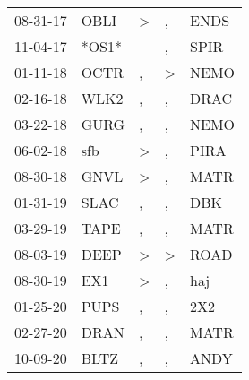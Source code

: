 \begin{supertabular}{p{0.07\textwidth}p{0.06\textwidth}p{0.02\textwidth}p{0.02\textwidth}p{0.06\textwidth}}
          08-31-17\textsuperscript{} &           OBLI\textsuperscript{} &     \textgreater &             , &  ENDS\textsuperscript{} \\
          11-04-17\textsuperscript{} &                            *OS1* &                  &             , &  SPIR\textsuperscript{} \\
          01-11-18\textsuperscript{} &           OCTR\textsuperscript{} &                , &  \textgreater &  NEMO\textsuperscript{} \\
          02-16-18\textsuperscript{} &           WLK2\textsuperscript{} &                , &             , &  DRAC\textsuperscript{} \\
          03-22-18\textsuperscript{} &           GURG\textsuperscript{} &                , &             , &  NEMO\textsuperscript{} \\
          06-02-18\textsuperscript{} &            sfb\textsuperscript{} &     \textgreater &             , &  PIRA\textsuperscript{} \\
          08-30-18\textsuperscript{} &           GNVL\textsuperscript{} &     \textgreater &             , &  MATR\textsuperscript{} \\
          01-31-19\textsuperscript{} &           SLAC\textsuperscript{} &                , &             , &   DBK\textsuperscript{} \\
          03-29-19\textsuperscript{} &           TAPE\textsuperscript{} &                , &             , &  MATR\textsuperscript{} \\
          08-03-19\textsuperscript{} &           DEEP\textsuperscript{} &     \textgreater &  \textgreater &  ROAD\textsuperscript{} \\
          08-30-19\textsuperscript{} &            EX1\textsuperscript{} &     \textgreater &             , &   haj\textsuperscript{} \\
          01-25-20\textsuperscript{} &           PUPS\textsuperscript{} &                , &             , &   2X2\textsuperscript{} \\
          02-27-20\textsuperscript{} &           DRAN\textsuperscript{} &                , &             , &  MATR\textsuperscript{} \\
          10-09-20\textsuperscript{} &           BLTZ\textsuperscript{} &                , &             , &  ANDY\textsuperscript{} \\
\end{supertabular}
